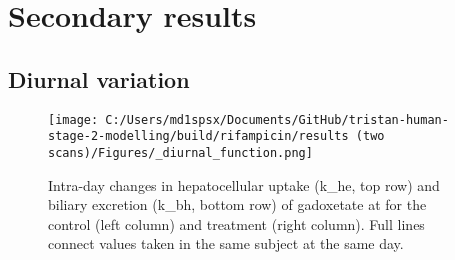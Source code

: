 \documentclass{epflreport}%
\begin{document}
\chapter{Secondary results}%
\section{Diurnal variation}%
\label{sec:Diurnalvariation}%

%


\begin{figure}[h!]%
\centering%
\texttt{[image: C:/Users/md1spsx/Documents/GitHub/tristan-human-stage-2-modelling/build/rifampicin/results (two scans)/Figures/\_diurnal\_function.png]}%
\caption{Intra{-}day changes in hepatocellular uptake (k\_he, top row) and biliary excretion (k\_bh, bottom row) of gadoxetate at for the control (left column) and treatment (right column). Full lines connect values taken in the same subject at the same day.}%
\end{figure}

%
\end{document}
